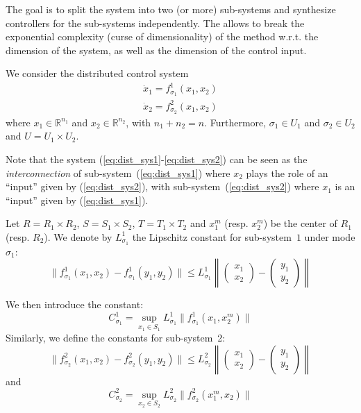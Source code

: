 The goal is to split the system into two (or more) sub-systems and
synthesize controllers for the sub-systems independently. The allows
to break the exponential complexity (curse of dimensionality) of the
method w.r.t. the dimension of the system, as well as the dimension of
the control input.

We consider the distributed control system
\begin{eqnarray}
 \dot x_1 = f_{\sigma_1}^1 (x_1,x_2)
  \label{eq:dist_sys1}\\
 \dot x_2 = f_{\sigma_2}^2 (x_1,x_2)
 \label{eq:dist_sys2}
\end{eqnarray}
where $x_1 \in \mathbb{R}^{n_1}$ and $x_2 \in \mathbb{R}^{n_2}$, with $n_1 + n_2 = n$.
Furthermore, $\sigma_1 \in U_1$ and $\sigma_2 \in U_2$ and $U = U_1 \times U_2$.
%

Note that the system (\ref{eq:dist_sys1}-\ref{eq:dist_sys2}) can be
seen as the {\em interconnection} of sub-system~(\ref{eq:dist_sys1})
where $x_2$ plays the role of an ``input'' given by
(\ref{eq:dist_sys2}), with sub-system~(\ref{eq:dist_sys2}) where $x_1$
is an ``input'' given by (\ref{eq:dist_sys1}).

%
Let $R = R_1 \times R_2$, $S = S_1 \times S_2$, $T = T_1 \times T_2$
and $x_1^m$ (resp. $x_2^m$) be the center of $R_1$ (resp. $R_2$).  We
denote by $L_{\sigma_1}^1$ the Lipschitz constant for sub-system~$1$
under mode $\sigma_1$:
$$ \| f_{\sigma_1}^1 (x_1,x_2) - f_{\sigma_1}^1 (y_1,y_2) \| \leq L_{\sigma_1}^1 \left\| \begin{pmatrix} x_1 \\ x_2 \end{pmatrix} - \begin{pmatrix} y_1 \\ y_2 \end{pmatrix} \right\|$$

We then introduce the constant:
$$ C_{\sigma_1}^1 = \sup_{x_1 \in S_1} L_{\sigma_1}^1 \| f_{\sigma_1}^1(x_1,x_2^m) \|$$
Similarly, we define the constants for sub-system~2:
$$ \| f_{\sigma_2}^2 (x_1,x_2) - f_{\sigma_2}^2 (y_1,y_2) \| \leq L_{\sigma_2}^2 \left\| \begin{pmatrix} x_1 \\ x_2 \end{pmatrix} - \begin{pmatrix} y_1 \\ y_2 \end{pmatrix} \right\|$$
and
$$ C_{\sigma_2}^2 = \sup_{x_2 \in S_2} L_{\sigma_2}^2 \| f_{\sigma_2}^2(x_1^m,x_2) \|$$

